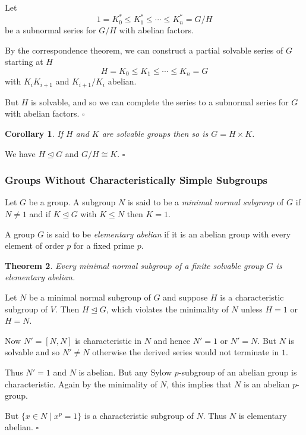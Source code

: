 \documentclass[10pt]{article}
\newtheorem{theorem}{Theorem}[section]
\newtheorem{corollary}[theorem]{Corollary}
\newenvironment{proof}[1][Proof]{\begin{trivlist}
\item[\hskip \labelsep {\itshape #1}]}{\end{trivlist}}
\newenvironment{definition}[1][Definition]{\begin{trivlist}
\item[\hskip \labelsep {\bfseries #1}]}{\end{trivlist}}
\begin{document}
\begin{proof}
Let
$$1 = K^*_0 \leq K^*_1 \leq \cdots \leq K^*_n = G/H$$
be a subnormal series for $G/H$ with abelian factors.

By the correspondence theorem, we can construct a partial solvable series of $G$ starting at $H$
$$H = K_0 \leq K_1 \leq \cdots \leq K_n = G$$
with $K_i \mathrel{K_{i+1}}$ and $K_{i+1}/K_i$ abelian.

But $H$ is solvable, and so we can complete the series to a subnormal series for $G$ with abelian factors. $\square$
\end{proof}

\begin{corollary}
If $H$ and $K$ are solvable groups then so is $G = H\times K$.
\end{corollary}

\begin{proof}
We have $H \mathrel{\unlhd} G$ and $G/H \cong K$. $\square$
\end{proof}

\subsubsection{Groups Without Characteristically Simple Subgroups}

\begin{definition}
Let $G$ be a group. A subgroup $N$ is said to be a \emph{minimal normal subgroup} of $G$ if $N \neq 1$ and if $K \mathrel{\unlhd} G$ with $K \leq N$ then $K = 1$.
\end{definition}

\begin{definition}
A group $G$ is said to be \emph{elementary abelian} if it is an abelian group with every element of order $p$ for a fixed prime $p$.
\end{definition}

\begin{theorem}
Every minimal normal subgroup of a finite solvable group $G$ is elementary abelian.
\end{theorem}

\begin{proof}
Let $N$ be a minimal normal subgroup of $G$ and suppose $H$ is a characteristic subgroup of $V$. Then $H \mathrel{\unlhd} G$, which violates the minimality of $N$ unless $H = 1$ or $H = N$.

Now $N' = [N, N]$ is characteristic in $N$ and hence $N' = 1$ or $N' = N$. But $N$ is solvable and so $N' \neq N$ otherwise the derived series would not terminate in $1$.

Thus $N' = 1$ and $N$ is abelian. But any Sylow $p$-subgroup of an abelian group is characteristic. Again by the minimality of $N$, this implies that $N$ is an abelian $p$-group.

But $\{x \in N \;|\; x^p = 1\}$ is a characteristic subgroup of $N$. Thus $N$ is elementary abelian. $\square$
\end{proof}
\end{document}
